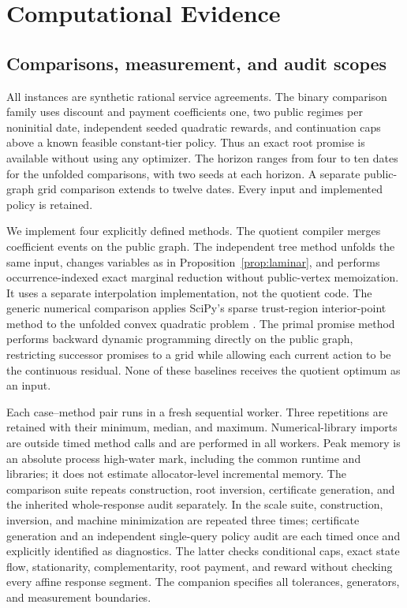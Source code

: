 \section{Computational Evidence}\label{sec:computational}
\subsection{Comparisons, measurement, and audit scopes}
All instances are synthetic rational service agreements. The binary comparison family uses discount and payment coefficients one, two public regimes per noninitial date, independent seeded quadratic rewards, and continuation caps above a known feasible constant-tier policy. Thus an exact root promise is available without using any optimizer. The horizon ranges from four to ten dates for the unfolded comparisons, with two seeds at each horizon. A separate public-graph grid comparison extends to twelve dates. Every input and implemented policy is retained.

We implement four explicitly defined methods. The quotient compiler merges coefficient events on the public graph. The independent tree method unfolds the same input, changes variables as in Proposition~\ref{prop:laminar}, and performs occurrence-indexed exact marginal reduction without public-vertex memoization. It uses a separate interpolation implementation, not the quotient code. The generic numerical comparison applies SciPy's sparse trust-region interior-point method to the unfolded convex quadratic problem \citep{Virtanen2020}. The primal promise method performs backward dynamic programming directly on the public graph, restricting successor promises to a grid while allowing each current action to be the continuous residual. None of these baselines receives the quotient optimum as an input.

Each case--method pair runs in a fresh sequential worker. Three repetitions are retained with their minimum, median, and maximum. Numerical-library imports are outside timed method calls and are performed in all workers. Peak memory is an absolute process high-water mark, including the common runtime and libraries; it does not estimate allocator-level incremental memory. The comparison suite repeats construction, root inversion, certificate generation, and the inherited whole-response audit separately. In the scale suite, construction, inversion, and machine minimization are repeated three times; certificate generation and an independent single-query policy audit are each timed once and explicitly identified as diagnostics. The latter checks conditional caps, exact state flow, stationarity, complementarity, root payment, and reward without checking every affine response segment. The companion specifies all tolerances, generators, and measurement boundaries.

